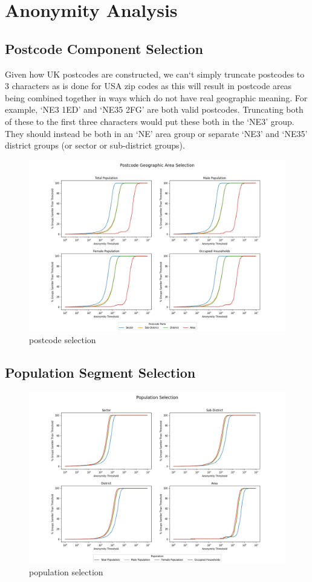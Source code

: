 \documentclass[12pt, a4paper]{article}
\begin{document}
\section{Anonymity Analysis}
\subsection{Postcode Component Selection}

Given how UK postcodes are constructed, we can`t simply truncate postcodes to 3 characters as is done for USA zip codes as this will result in postcode areas being combined together in ways which do not have real geographic meaning. For example, `NE3 1ED' and `NE35 2FG' are both valid postcodes. Truncating both of these to the first three characters would put these both in the `NE3' group. They should instead be both in an `NE' area group or separate `NE3' and `NE35' district groups (or sector or sub-district groups).

\begin{figure}
\includegraphics[width=1\textwidth,trim={0.1cm, 0.1cm, 0.1cm, 0.1cm},clip]{images/postode_selection.png}
\caption{postcode selection}\label{fig:postcode_selection}
\end{figure}

\subsection{Population Segment Selection}

\begin{figure}
\includegraphics[width=1\textwidth,trim={0.1cm, 0.1cm, 0.1cm, 0.1cm},clip]{images/population_selection.png}
\caption{population selection}\label{fig:population_selection}
\end{figure}
\end{document}
